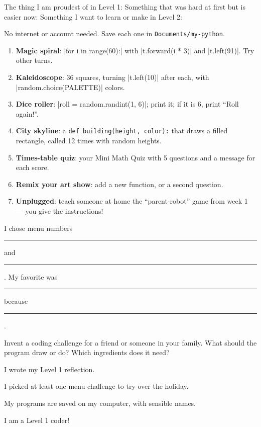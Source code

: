 \namedateline

\begin{core}
The thing I am proudest of in Level 1:
Something that was hard at first but is easier now:
Something I want to learn or make in Level 2:
\end{core}

\begin{challenge}
No internet or account needed. Save each one in \texttt{Documents/my-python}.
\begin{enumerate}[leftmargin=1.6em,itemsep=2pt]
  \item \textbf{Magic spiral}: \py|for i in range(60):| with \py|t.forward(i * 3)| and \py|t.left(91)|. Try other turns.
  \item \textbf{Kaleidoscope}: 36 squares, turning \py|t.left(10)| after each, with \py|random.choice(PALETTE)| colors.
  \item \textbf{Dice roller}: \py|roll = random.randint(1, 6)|; print it; if it is 6, print \enquote{Roll again!}.
  \item \textbf{City skyline}: a \texttt{def building(height, color):} that draws a filled rectangle, called 12 times with random heights.
  \item \textbf{Times-table quiz}: your Mini Math Quiz with 5 questions and a message for each score.
  \item \textbf{Remix your art show}: add a new function, or a second question.
  \item \textbf{Unplugged}: teach someone at home the \enquote{parent-robot} game from week 1 --- you give the instructions!
\end{enumerate}
I chose menu numbers \rule{1.2cm}{0.4pt} and \rule{1.2cm}{0.4pt}. My favorite was \rule{6cm}{0.4pt} because \rule{4cm}{0.4pt}.
\end{challenge}

\begin{creative}
Invent a coding challenge for a friend or someone in your family. What should the program draw or do? Which ingredients does it need?
\end{creative}

\begin{selfcheck}
  \item I wrote my Level 1 reflection.
  \item I picked at least one menu challenge to try over the holiday.
  \item My programs are saved on my computer, with sensible names.
  \item I am a Level 1 coder!
\end{selfcheck}
